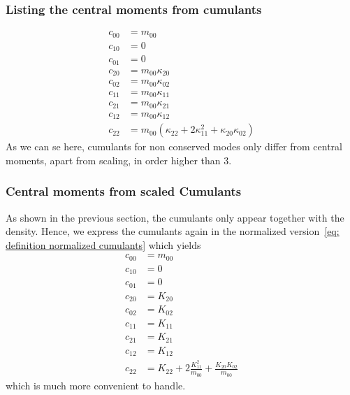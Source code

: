 \subsubsection{Listing the central moments from cumulants}
\label{subs:Listing the central moments from cumulants}
\begin{equation}
  \label{eq:all central moments from cumulants}
  \begin{aligned}
    c_{00} & = m_{00} \\
    c_{10} & = 0 \\
    c_{01} & = 0 \\
    c_{20} & = m_{00}\kappa_{20} \\
    c_{02} & = m_{00}\kappa_{02} \\
    c_{11} & = m_{00}\kappa_{11} \\
    c_{21} & = m_{00}\kappa_{21} \\
    c_{12} & = m_{00}\kappa_{12} \\
    c_{22} & = m_{00}(\kappa_{22} + 2\kappa_{11}^2 + \kappa_{20}\kappa_{02})
  \end{aligned}
\end{equation}
As we can se here, cumulants for non conserved modes only differ from central moments, apart from scaling, in order higher than $3$.

\subsubsection{Central moments from scaled Cumulants}
\label{subs:Central moments from scaled Cumulants}

As shown in the previous section, the cumulants only appear together with the density. Hence, we express the cumulants again in the normalized version~\eqref{eq: definition normalized cumulants} which yields
\begin{equation}
  \label{eq:all central moments from normalized cumulants}
  \begin{aligned}
    c_{00} & = m_{00}\\
    c_{10} & = 0 \\
    c_{01} & = 0 \\
    c_{20} & = K_{20} \\
    c_{02} & = K_{02} \\
    c_{11} & = K_{11} \\
    c_{21} & = K_{21} \\
    c_{12} & = K_{12} \\
    c_{22} & = K_{22} + 2 \frac{K_{11}^2}{m_{00}} + \frac{K_{20}K_{02}}{m_{00}}
  \end{aligned}
\end{equation}
which is much more convenient to handle.

